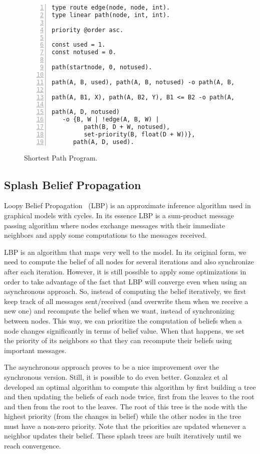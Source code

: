 \begin{figure}[h!]
\small\begin{Verbatim}[numbers=left]
type route edge(node, node, int).
type linear path(node, int, int).

priority @order asc.

const used = 1.
const notused = 0.

path(startnode, 0, notused).

path(A, B, used), path(A, B, notused) -o path(A, B, used).

path(A, B1, X), path(A, B2, Y), B1 <= B2 -o path(A, B1, X).

path(A, D, notused)
   -o {B, W | !edge(A, B, W) |
         path(B, D + W, notused),
         set-priority(B, float(D + W))},
      path(A, D, used).
\end{Verbatim}
  \caption{Shortest Path Program.}
  \label{code:shortest_path_program}
\end{figure}
\normalsize

\subsection{Splash Belief Propagation}

Loopy Belief Propagation~\cite{Murphy99loopybelief} (LBP) is an approximate inference algorithm
used in graphical models with cycles. In its essence LBP is a sum-product message passing algorithm
where nodes exchange messages with their immediate neighbors and apply some computations to the messages
received.

LBP is an algorithm that maps very well to the \lang model. In its original form, we need to compute
the belief of all nodes for several iterations and also synchronize after each iteration.
However, it is still possible to apply
some optimizations in order to take advantage of the fact that LBP will converge even when using
an asynchronous approach. So, instead of computing the belief iteratively,
we first keep track of all messages sent/received (and overwrite them when we receive a new one)
and recompute the belief when we want, instead of synchronizing between nodes.
This way, we can prioritize the computation of beliefs when
a node changes significantly in terms of belief value. When that happens, we set the priority of its
neighbors so that they can recompute their beliefs using important messages.

The asynchronous approach proves to be a nice improvement over the synchronous version. Still, it
is possible to do even better. Gonzalez et al~\cite{Gonzalez+al:aistats09paraml} developed an optimal
algorithm to compute this algorithm by first building a tree and then updating the beliefs of each node twice, first from the leaves to the root and then from the root to the leaves. The root of this tree
is the node with the highest priority (from the changes in belief) while the other nodes in the tree
must have a non-zero priority. Note that the priorities are updated whenever a neighbor updates
their belief. These splash trees are built iteratively until we reach convergence.


